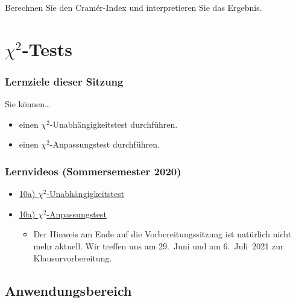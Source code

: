 \documentclass[
  11pt,
  ngerman,
  a4paper,
]{report}
\providecommand{\tightlist}{%
  \setlength{\itemsep}{0pt}\setlength{\parskip}{0pt}}
\begin{document}
Berechnen Sie den Cramér-Index und interpretieren Sie das Ergebnis.

\hypertarget{chi2-tests}{%
\chapter{\texorpdfstring{\(\chi^2\)-Tests}{\textbackslash chi\^{}2-Tests}}\label{chi2-tests}}

\hypertarget{lernziele-dieser-sitzung-9}{%
\subsection*{Lernziele dieser Sitzung}\label{lernziele-dieser-sitzung-9}}

Sie können\ldots{}

\begin{itemize}
\tightlist
\item
  einen \(\chi^2\)-Unabhängigkeitstest durchführen.
\item
  einen \(\chi^2\)-Anpassungstest durchführen.
\end{itemize}

\hypertarget{lernvideos-sommersemester-2020-1}{%
\subsection*{Lernvideos (Sommersemester 2020)}\label{lernvideos-sommersemester-2020-1}}

\begin{itemize}
\tightlist
\item
  \href{https://video01.uni-frankfurt.de/Mediasite/Play/201d31a1bd8448a8a22dd61396f3126c1d}{10a) \(\chi^2\)-Unabhängigkeitstest}
\item
  \href{https://video01.uni-frankfurt.de/Mediasite/Play/587c77b97ba84bb696efec95b25591d61d}{10a) \(\chi^2\)-Anpassungstest}

  \begin{itemize}
  \tightlist
  \item
    Der Hinweis am Ende auf die Vorbereitungssitzung ist natürlich nicht mehr aktuell. Wir treffen uns am 29.~Juni und am 6.~Juli~2021 zur Klausurvorbereitung.
  \end{itemize}
\end{itemize}

\hypertarget{anwendungsbereich}{%
\section*{Anwendungsbereich}\label{anwendungsbereich}}
\end{document}
